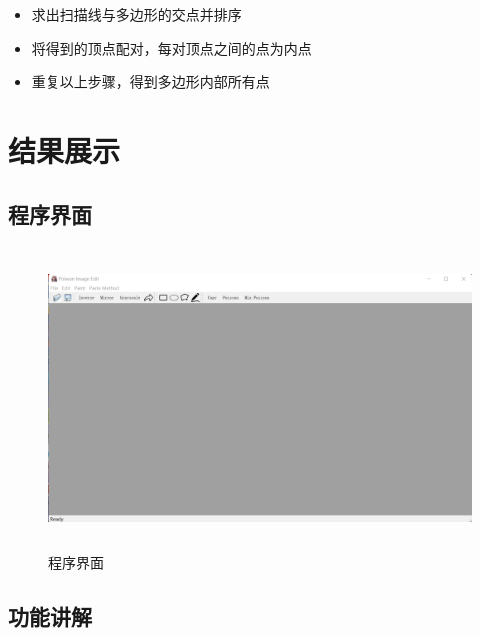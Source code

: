 \documentclass{article}
\begin{document}
	\begin{itemize}
	\item 求出扫描线与多边形的交点并排序
    \end{itemize}


	\begin{itemize}
	\item 将得到的顶点配对，每对顶点之间的点为内点
    \end{itemize}

	\begin{itemize}
	\item 重复以上步骤，得到多边形内部所有点
    \end{itemize}
	
	
	
	\section{结果展示}
	
	 \subsection{程序界面}
	
	\begin{figure}[H]
		\begin{center}
			
			\includegraphics[width=13cm,height=8cm]{jiemian}
			
			\caption{程序界面} \label{jiemian.label}
		\end{center}
	\end{figure}
	
     \subsection{功能讲解}
     
\end{document}
